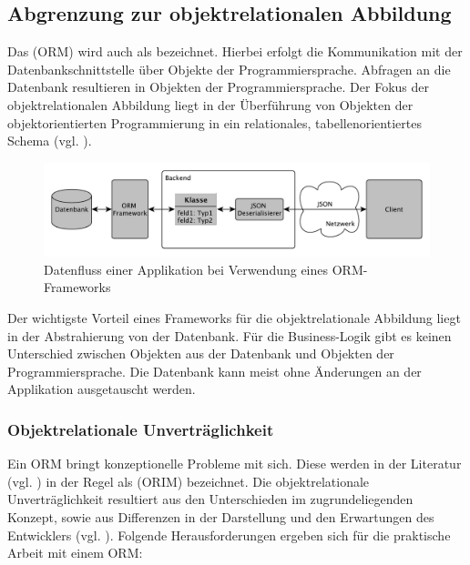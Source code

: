 \subsection{Abgrenzung zur objektrelationalen Abbildung}
Das  (ORM) wird auch als  bezeichnet. Hierbei erfolgt die Kommunikation mit der Datenbankschnittstelle über Objekte der Programmiersprache. Abfragen an die Datenbank resultieren in Objekten der Programmiersprache. Der Fokus der objektrelationalen Abbildung liegt in der Überführung von Objekten der objektorientierten Programmierung in ein relationales, tabellenorientiertes Schema (vgl. \cite{wambler}). 

\begin{figure}[h]   
  \centering     
  \includegraphics[width=1.0\textwidth]{img/dataflow_orm.pdf}  
   \caption{Datenfluss einer Applikation bei Verwendung eines ORM-\gls{Framework}s \protect\footnotemark}   
  \label{fig:orm} 
\end{figure}

Der wichtigste Vorteil eines \gls{Framework}s für die objektrelationale Abbildung liegt in der Abstrahierung von der Datenbank. Für die \gls{Business-Logik} gibt es keinen Unterschied zwischen Objekten aus der Datenbank und Objekten der Programmiersprache. Die Datenbank kann meist ohne Änderungen an der Applikation ausgetauscht werden.

\FloatBarrier
\subsubsection{Objektrelationale Unverträglichkeit}
\label{sec:unvertraeglich}
Ein ORM bringt konzeptionelle Probleme mit sich. Diese werden in der Literatur (vgl. \cite{ireland2009classification}) in der Regel als  (ORIM) bezeichnet. Die objektrelationale Unverträglichkeit resultiert aus den Unterschieden im zugrundeliegenden Konzept, sowie aus Differenzen in der Darstellung und den Erwartungen des Entwicklers (vgl. \cite{bowers}).
\pagebreak %
Folgende Herausforderungen ergeben sich für die praktische Arbeit mit einem ORM:

